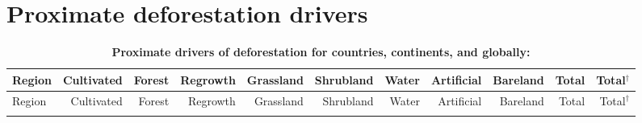 \chapter{Proximate deforestation drivers}
\label{ch:appendix_c}
	\begin{scriptsize}
	\begin{landscape}
		\begin{center}
			\begin{longtable}[ht]{lrrrrrrrrrr}
			\caption[Proximate drivers of deforestation for countries, continents, and globally]{\textbf{Proximate drivers of deforestation for countries, continents, and globally:}} \label{tab:proximate_driver}\\

			\hline
			Region&Cultivated&Forest&Regrowth&Grassland&Shrubland&Water&Artificial&Bareland&Total&Total$^\dagger$\\
			\hline
			\endfirsthead

			\hline
			Region&Cultivated&Forest&Regrowth&Grassland&Shrubland&Water&Artificial&Bareland&Total&Total$^\dagger$\\
			\hline
			\endhead

			\hline
			\endfoot


\end{longtable}
\end{center}
\end{landscape}
\end{scriptsize}
